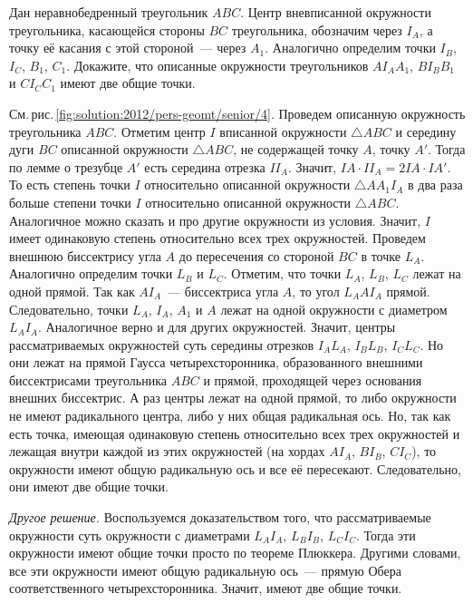 \problem
Дан неравнобедренный треугольник $ABC$.
Центр вневписанной окружности треугольника, касающейся стороны $BC$
треугольника, обозначим через $I_A$, а точку её касания с этой стороной~---
через $A_1$.
Аналогично определим точки $I_B$, $I_C$, $B_1$, $C_1$.
Докажите, что описанные окружности треугольников
$A I_A A_1$, $B I_B B_1$ и $C I_C C_1$ имеют две общие точки.

%
\label{solution:2012/pers-geomt/senior/4}%
См.\,рис.\,\ref{fig:solution:2012/pers-geomt/senior/4}.
Проведем описанную окружность треугольника $ABC$.
Отметим центр $I$ вписанной окружности $\triangle ABC$ и середину дуги $BC$
описанной окружности $\triangle ABC$, не содержащей точку $A$, точку $A'$.
Тогда по лемме о трезубце $A'$ есть середина отрезка $I I_A$.
Значит, $I A \cdot I I_A = 2 I A \cdot I A'$.
То есть степень точки $I$ относительно описанной окружности
$\triangle A A_1 I_A$ в два раза больше степени точки $I$ относительно описанной
окружности $\triangle ABC$.
Аналогичное можно сказать и про другие окружности из условия.
Значит, $I$ имеет одинаковую степень относительно всех трех окружностей.
Проведем внешнюю биссектрису угла $A$ до пересечения со стороной $BC$ в
точке $L_A$.
Аналогично определим точки $L_B$ и $L_C$.
Отметим, что точки $L_A$, $L_B$, $L_C$ лежат на одной прямой.
Так как $AI_A$~--- биссектриса угла $A$, то угол $L_AAI_A$ прямой.
Следовательно, точки $L_A$, $I_A$, $A_1$ и $A$ лежат на одной окружности с
диаметром $L_AI_A$.
Аналогичное верно и для других окружностей.
Значит, центры рассматриваемых окружностей суть середины отрезков
$I_A L_A$, $I_B L_B$, $I_C L_C$.
Но они лежат на прямой Гаусса четырехсторонника, образованного внешними
биссектрисами треугольника $ABC$ и прямой, проходящей через основания внешних
биссектрис.
А раз центры лежат на одной прямой, то либо окружности не имеют радикального
центра, либо у них общая радикальная ось.
Но, так как есть точка, имеющая одинаковую степень относительно всех трех
окружностей и лежащая внутри каждой из этих окружностей
(на хордах $A I_A$, $B I_B$, $C I_C$),
то окружности имеют общую радикальную ось и все её пересекают.
Следовательно, они имеют две общие точки.
\par
\emph{Другое решение.}
Воспользуемся доказательством того, что рассматриваемые окружности суть
окружности с диаметрами $L_A I_A$, $L_B I_B$, $L_C I_C$.
Тогда эти окружности имеют общие точки просто по теореме Плюккера.
Другими словами, все эти окружности имеют общую радикальную ось~---
прямую Обера соответственного четырехсторонника.
Значит, имеют две общие точки.

\endproblem
